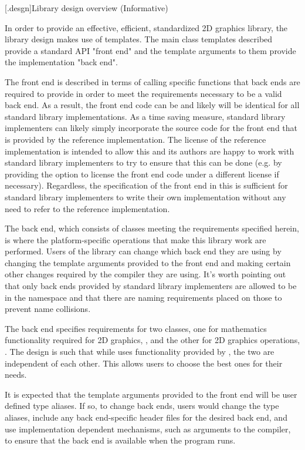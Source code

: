 [\iotwod.desgn]{Library design overview (Informative)}

\pnum
In order to provide an effective, efficient, standardized 2D graphics library, the library design makes use of templates. The main class templates described provide a standard API "front end" and the template arguments to them provide the implementation "back end".

\pnum
The front end is described in terms of calling specific functions that back ends are required to provide in order to meet the requirements necessary to be a valid back end. As a result, the front end code can be and likely will be identical for all standard library implementations. As a time saving measure, standard library implementers can likely simply incorporate the source code for the front end that is provided by the reference implementation. The license of the reference implementation is intended to allow this and its authors are happy to work with standard library implementers to try to ensure that this can be done (e.g. by providing the option to license the front end code under a different license if necessary). Regardless, the specification of the front end in this \documenttypename{} is sufficient for standard library implementers to write their own implementation without any need to refer to the reference implementation.

\pnum
The back end, which consists of classes meeting the requirements specified herein, is where the platform-specific operations that make this library work are performed. Users of the library can change which back end they are using by changing the template arguments provided to the front end and making certain other changes required by the compiler they are using. It's worth pointing out that only back ends provided by standard library implementers are allowed to be in the  namespace and that there are naming requirements placed on those to prevent name collisions.

\pnum
The back end specifies requirements for two classes, one for mathematics functionality required for 2D graphics, \graphicsmathtemplparamnospace{}, and the other for 2D graphics operations, \graphicssurfacestemplparamnospace{}. The design is such that while \graphicssurfacestemplparamnospace{} uses functionality provided by \graphicsmathtemplparamnospace{}, the two are independent of each other. This allows users to choose the best ones for their needs.

\pnum
It is expected that the template arguments provided to the front end will be user defined type aliases. If so, to change back ends, users would change the type aliases, include any back end-specific header files for the desired back end, and use implementation dependent mechanisms, such as arguments to the compiler, to ensure that the back end is available when the program runs.

